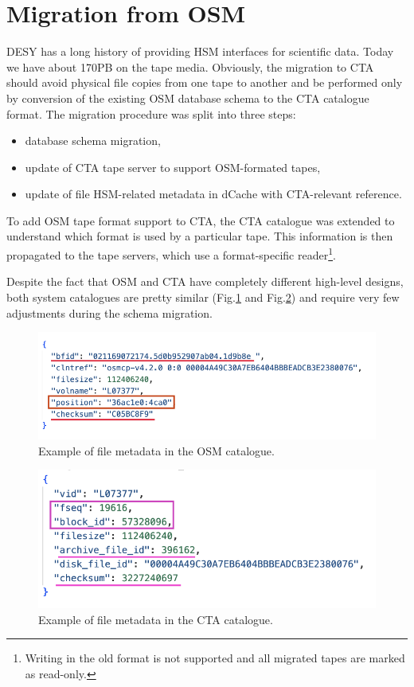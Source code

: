 \documentclass{webofc}
\begin{document}
\section{Migration from OSM}
\label{migraion}

DESY has a long history of providing HSM interfaces for scientific data. Today we have about 170PB on the tape media. Obviously, the migration to CTA should avoid physical file copies from one tape to another and be performed only by conversion of the existing OSM database schema to the CTA catalogue format. The migration procedure was split into three steps:
\begin{itemize}
    \item database schema migration,
    \item update of CTA tape server to support OSM-formated tapes,
    \item update of file HSM-related metadata in dCache with CTA-relevant reference.
\end{itemize}

To add OSM tape format support to CTA, the CTA catalogue was extended to understand 
which format is used by a particular tape. This information is then propagated to the tape servers, which use a format-specific reader\footnote{Writing in the old format is not supported and all migrated tapes are marked as read-only.}.

Despite the fact that OSM and CTA have completely different high-level designs, both system catalogues are pretty similar (Fig.\ref{fig:osm_entry_example} and Fig.\ref{fig:cta_entry_example}) and require very few adjustments during the schema migration.

\begin{figure}[h]
    \centering
    \includegraphics[scale=0.60]{osm-schema.png}
    \caption{Example of file metadata in the OSM catalogue.}
    \label{fig:osm_entry_example}
\end{figure}

\begin{figure}[h]
    \centering
    \includegraphics[scale=0.60]{cta-schema.png}
    \caption{Example of file metadata in the CTA catalogue.}
    \label{fig:cta_entry_example}
\end{figure}
\end{document}
